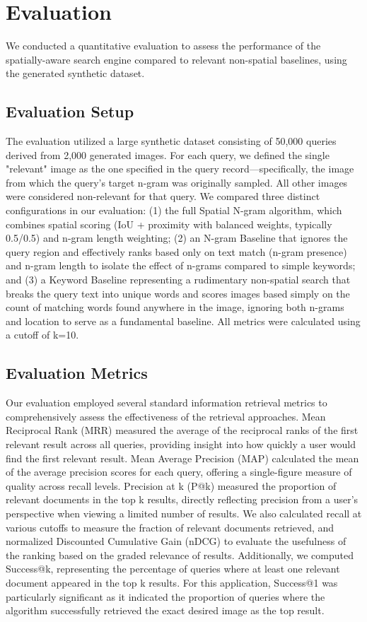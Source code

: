 \documentclass[manuscript,screen]{acmart}
\begin{document}
\section{Evaluation}

We conducted a quantitative evaluation to assess the performance of the spatially-aware search engine compared to relevant non-spatial baselines, using the generated synthetic dataset.

\subsection{Evaluation Setup}

The evaluation utilized a large synthetic dataset consisting of 50,000 queries derived from 2,000 generated images. For each query, we defined the single "relevant" image as the one specified in the query record—specifically, the image from which the query's target n-gram was originally sampled. All other images were considered non-relevant for that query. We compared three distinct configurations in our evaluation: (1) the full Spatial N-gram algorithm, which combines spatial scoring (IoU + proximity with balanced weights, typically 0.5/0.5) and n-gram length weighting; (2) an N-gram Baseline that ignores the query region and effectively ranks based only on text match (n-gram presence) and n-gram length to isolate the effect of n-grams compared to simple keywords; and (3) a Keyword Baseline representing a rudimentary non-spatial search that breaks the query text into unique words and scores images based simply on the count of matching words found anywhere in the image, ignoring both n-grams and location to serve as a fundamental baseline. All metrics were calculated using a cutoff of k=10.

\subsection{Evaluation Metrics}

Our evaluation employed several standard information retrieval metrics to comprehensively assess the effectiveness of the retrieval approaches. Mean Reciprocal Rank (MRR) measured the average of the reciprocal ranks of the first relevant result across all queries, providing insight into how quickly a user would find the first relevant result. Mean Average Precision (MAP) calculated the mean of the average precision scores for each query, offering a single-figure measure of quality across recall levels. Precision at k (P@k) measured the proportion of relevant documents in the top k results, directly reflecting precision from a user's perspective when viewing a limited number of results. We also calculated recall at various cutoffs to measure the fraction of relevant documents retrieved, and normalized Discounted Cumulative Gain (nDCG) to evaluate the usefulness of the ranking based on the graded relevance of results. Additionally, we computed Success@k, representing the percentage of queries where at least one relevant document appeared in the top k results. For this application, Success@1 was particularly significant as it indicated the proportion of queries where the algorithm successfully retrieved the exact desired image as the top result.
\end{document}

